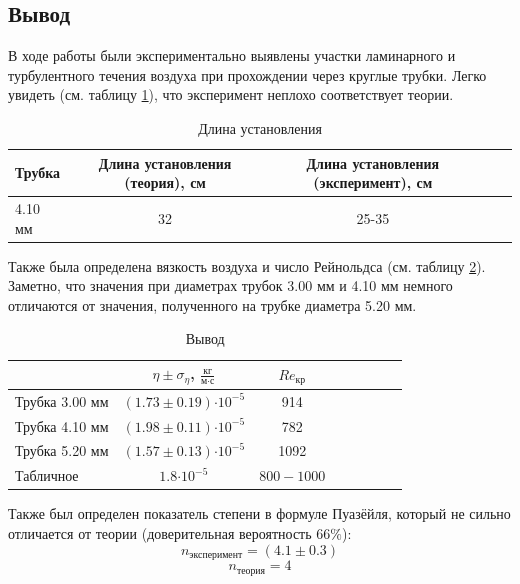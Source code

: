 \documentclass[12pt,a4paper]{article}
\newcommand{\e}[1]{\text{$\cdot10^{#1}$}}
\newcommand{\uf}[2]{\text{$\frac{\text{#1}}{\text{#2}}$}}
\begin{document}
\subsection*{Вывод}
В ходе работы были экспериментально выявлены участки ламинарного и турбулентного течения воздуха при прохождении через круглые трубки. Легко увидеть (см. таблицу \ref{tab:PXS}), что эксперимент неплохо соответствует теории.

\begin{table}[H]
	
	\caption{Длина установления}
	\label{tab:PXS}
	\centering
	\footnotesize
	\begin{tabular}{lcccc}
		\toprule
		Трубка & Длина установления (теория), см & Длина установления (эксперимент), см \\
		\midrule
		4.10 мм & 32  &  25-35 \\
		\bottomrule
	\end{tabular}
\end{table}

Также была определена вязкость воздуха и число Рейнольдса (см. таблицу \ref{tab:vivod}).
Заметно, что значения при диаметрах трубок 3.00 мм и 4.10 мм немного отличаются от значения, полученного на трубке диаметра 5.20 мм.
\begin{table}[H]
	\caption{Вывод}
	\label{tab:vivod}
	\centering
	\footnotesize
	\begin{tabular}{lccccccc}
		\toprule
		
		& $\eta \pm \sigma_{\eta}$, $\uf{кг}{м$\cdot$с}$ & $Re_{\text{кр}}$\\
		\midrule
		Трубка 3.00 мм &  $(1.73\pm0.19)\e{-5}$ & 914\\ 
		Трубка 4.10 мм &  $(1.98\pm0.11)\e{-5}$ &  782\\ 
		Трубка 5.20 мм & $(1.57\pm0.13)\e{-5}$ &  1092\\ 
		Табличное & $1.8\e{-5}$ &  $800-1000$\\
		\bottomrule
	\end{tabular}
\end{table}
Также был определен показатель степени в формуле Пуазёйля, который не сильно отличается от теории (доверительная вероятность $66\%$):
$$n_{\text{эксперимент}} = (4.1\pm 0.3)$$
$$n_{\text{теория}} = 4$$
\end{document}
